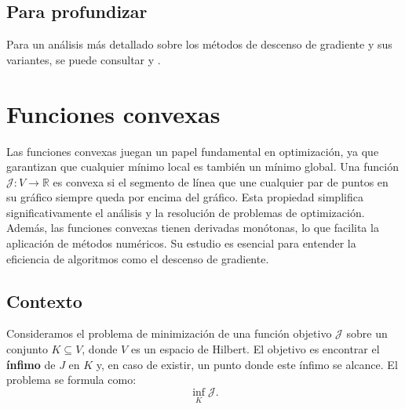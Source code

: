 \documentclass[12pt]{book}
\theoremstyle{definition}
\theoremstyle{plain}
\theoremstyle{remark}
\begin{document}
\section{Para profundizar}

Para un análisis más detallado sobre los métodos de descenso de gradiente y sus variantes, se puede consultar 
\cite[Capítulo~11]{ggk}
y
\cite[Capítulos~9--10]{allaire2007}.

%
%




\chapter{Funciones convexas}
Las funciones convexas juegan un papel fundamental en optimización, ya que garantizan que cualquier mínimo local es también un mínimo global. Una función $\mathcal{J}: V \to \mathbb{R}$ es convexa si el segmento de línea que une cualquier par de puntos en su gráfico siempre queda por encima del gráfico. Esta propiedad simplifica significativamente el análisis y la resolución de problemas de optimización. Además, las funciones convexas tienen derivadas monótonas, lo que facilita la aplicación de métodos numéricos. Su estudio es esencial para entender la eficiencia de algoritmos como el descenso de gradiente. %


\section{Contexto}

Consideramos el problema de minimización de una función objetivo $\mathcal{J}$ sobre un conjunto $K \subseteq V$, donde $V$ es un espacio de Hilbert. El objetivo es encontrar el \textbf{ínfimo} de $J$ en $K$ y, en caso de existir, un punto donde este ínfimo se alcance.
%
El problema se formula como:
\begin{equation}
    \label{pb}
    \inf_{K} \mathcal{J}.
\end{equation}
\end{document}
